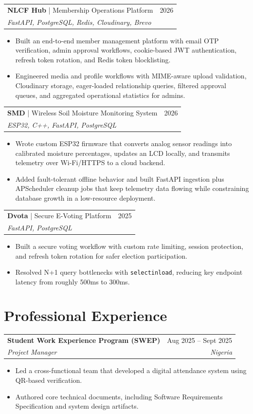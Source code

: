\documentclass[10pt, letterpaper]{article}
\newcommand{\resumeItem}[1]{\item #1}
\newcommand{\resumeSubheading}[4]{
    \begin{tabularx}{\textwidth}{Xr}
        \textbf{#1} & #2 \\
        \textit{#3} & \textit{#4} \\
    \end{tabularx}
}
\newcommand{\resumeProject}[4]{
    \begin{tabularx}{\textwidth}{Xr}
        \textbf{#1} \hspace{4pt} {\small #2} & #3 \\
        \multicolumn{2}{l}{\textit{#4}} \\
    \end{tabularx}
}
\begin{document}
\resumeProject
    {NLCF Hub}{| Membership Operations Platform}
    {2026}
    {FastAPI, PostgreSQL, Redis, Cloudinary, Brevo}
\begin{itemize}[leftmargin=0.15in, itemsep=1pt, topsep=2pt]
    \resumeItem{Built an end-to-end member management platform with email OTP verification, admin approval workflows, cookie-based JWT authentication, refresh token rotation, and Redis token blocklisting.}
    \resumeItem{Engineered media and profile workflows with MIME-aware upload validation, Cloudinary storage, eager-loaded relationship queries, filtered approval queues, and aggregated operational statistics for admins.}
\end{itemize}

\resumeProject
    {SMD}{| Wireless Soil Moisture Monitoring System}
    {2026}
    {ESP32, C++, FastAPI, PostgreSQL}
\begin{itemize}[leftmargin=0.15in, itemsep=1pt, topsep=2pt]
    \resumeItem{Wrote custom ESP32 firmware that converts analog sensor readings into calibrated moisture percentages, updates an LCD locally, and transmits telemetry over Wi-Fi/HTTPS to a cloud backend.}
    \resumeItem{Added fault-tolerant offline behavior and built FastAPI ingestion plus APScheduler cleanup jobs that keep telemetry data flowing while constraining database growth in a low-resource deployment.}
\end{itemize}

\resumeProject
    {Dvota}{| Secure E-Voting Platform}{2025}
    {FastAPI, PostgreSQL}
\begin{itemize}[leftmargin=0.15in, itemsep=1pt, topsep=2pt]
    \resumeItem{Built a secure voting workflow with custom rate limiting, session protection, and refresh token rotation for safer election participation.}
    \resumeItem{Resolved N+1 query bottlenecks with \texttt{selectinload}, reducing key endpoint latency from roughly 500ms to 300ms.}
\end{itemize}

\section{Professional Experience}
\resumeSubheading
    {Student Work Experience Program (SWEP)}{Aug 2025 -- Sept 2025}
    {Project Manager}{Nigeria}
\begin{itemize}[leftmargin=0.15in, itemsep=1pt, topsep=2pt]
    \resumeItem{Led a cross-functional team that developed a digital attendance system using QR-based verification.}
    \resumeItem{Authored core technical documents, including Software Requirements Specification and system design artifacts.}
\end{itemize}
\end{document}
